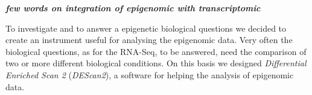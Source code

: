 
\textbf{\textsl{few words on integration of epigenomic with transcriptomic}}

To investigate and to answer a epigenetic biological questions we decided to create an instrument useful for analysing the epigenomic data.
Very often the biological questions, as for the RNA-Seq, to be answered, need the comparison of two or more different biological conditions.
On this basis we designed \textit{Differential Enriched Scan 2} (\textit{DEScan2}), a software for helping the analysis of epigenomic data.